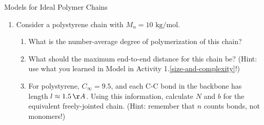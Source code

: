 \begin{activity}{Models for Ideal Polymer Chains}
\begin{exercises}
\begin{enumerate}
			\item Consider a polystyrene chain with $M_n=10\text{ kg/mol}$.
			
				\begin{enumerate}
					\item What is the number-average degree of polymerization of this chain?
				
				\begin{solution}\end{solution}
				
					\item What should the maximum end-to-end distance for this chain be?  (Hint: use what you learned in Model \label{size-and-complexity:mdl:polyethylenesize} in Activity 1.\ref{size-and-complexity}!)
				
				\begin{solution}\end{solution}
					
					\item For polystyrene, $C_\infty=9.5$, and each C-C bond in the backbone has length $l\approx 1.5\,\AA$.  Using this information, calculate $N$ and $b$ for the equivalent freely-jointed chain. (Hint: remember that $n$ counts bonds, not monomers!)
				
				\begin{solution}\end{solution}
				

\end{enumerate}
\end{enumerate}
\end{exercises}
\end{activity}
